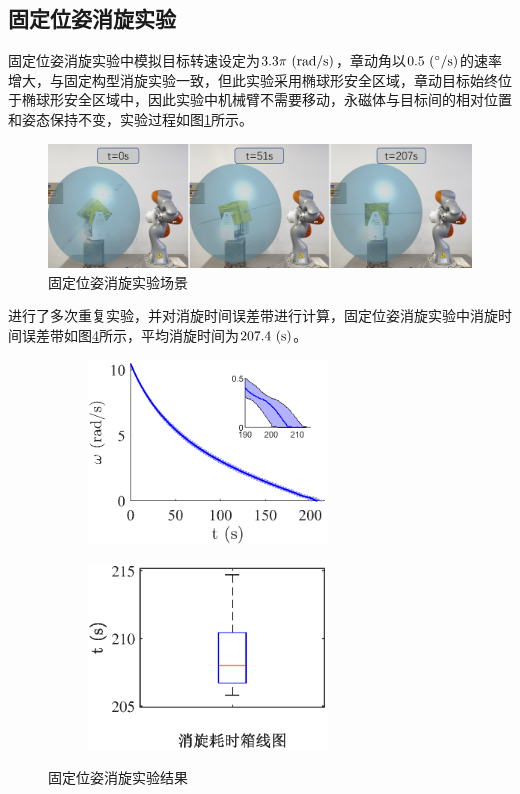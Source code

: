 \documentclass[lang=chs, degree=master, blindreview=false, winfonts=true]{yanputhesis}
\begin{document}
\subsection{固定位姿消旋实验}
固定位姿消旋实验中模拟目标转速设定为$3.3\pi\ \rm{(rad/s)}$，章动角以$0.5\ \rm{(^\circ/s)}$的速率增大，与固定构型消旋实验一致，但此实验采用椭球形安全区域，章动目标始终位于椭球形安全区域中，因此实验中机械臂不需要移动，永磁体与目标间的相对位置和姿态保持不变，实验过程如图\ref{fig:posifix_exp}所示。

\begin{figure}[htbp]
	\centering
	\includegraphics[width = 5.4in]{picture/posifix_exp.png}
	\caption{固定位姿消旋实验场景}
	\label{fig:posifix_exp}
\end{figure}

进行了多次重复实验，并对消旋时间误差带进行计算，固定位姿消旋实验中消旋时间误差带如图\ref{Fig.posifix_result}所示，平均消旋时间为$207.4\ \rm{(s)}$。
\begin{figure}[htb]
	\centering
	\begin{minipage}[t]{0.96\textwidth}
		\centering
		\begin{subfigure}[t]{0.47\textwidth}
			\centering
			\includegraphics[width = 2.5in]{picture/posifix_errbar.eps}
			\caption{ }
			\label{fig:posifix_errbar}
		\end{subfigure}\hfill
		\begin{subfigure}[t]{0.47\textwidth}
			\centering
			\includegraphics[width = 2.5in]{picture/posifix_boxline.eps}
			\caption{ }
			\label{fig:posifix_boxline}
		\end{subfigure}
	\end{minipage}
	\caption{固定位姿消旋实验结果\label{Fig.posifix_result}}
\end{figure}
\end{document}
